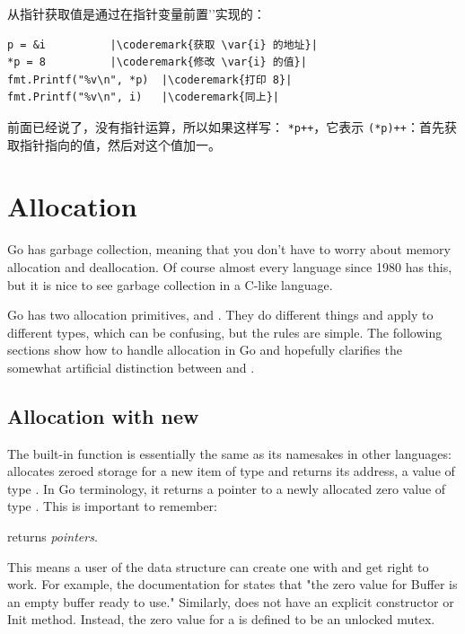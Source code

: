 从指针获取值是通过在指针变量前置'\type{*}'实现的：
\begin{lstlisting}[caption=获取指针指向的值,label=src:deref]
p = &i			|\coderemark{获取 \var{i} 的地址}|
*p = 8			|\coderemark{修改 \var{i} 的值}|
fmt.Printf("%v\n", *p)  |\coderemark{打印 8}|
fmt.Printf("%v\n", i)	|\coderemark{同上}|
\end{lstlisting}

前面已经说了，没有指针运算，所以如果这样写：
\lstinline{*p++}，它表示 \lstinline{(*p)++}：首先获取指针指向的值，然后对这个值加一。


\section{Allocation}
Go has garbage collection, meaning that you don't have to worry about
memory allocation and deallocation. Of course almost every language
since 1980 has this, but it is nice to see garbage collection in a
C-like language.

Go has two allocation primitives,  and . They do different
things and apply to different types, which can be confusing, but the
rules are simple.
The following sections show how to handle allocation
in Go and hopefully clarifies the somewhat artificial distinction between
 and . 

\subsection{Allocation with new}
\label{sec:allocation with new}
The built-in function  is 
essentially the same as its namesakes in other languages: 
allocates zeroed storage for a new item of type  and returns its
address, a value of type . In Go terminology, it returns a pointer to
a newly allocated zero value of type . This is important to
remember:
\begin{lbar}
 returns \emph{pointers}.
\end{lbar}

This
means a user of the data structure can create one with  and get
right to work. For example, the documentation for  states
that "the zero value for Buffer is an empty buffer ready to use."
Similarly,  does not have an explicit constructor or Init
method. Instead, the zero value for a  is defined to be an
unlocked mutex.

